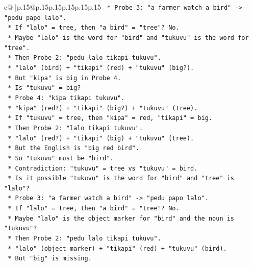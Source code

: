 \documentclass{article}
\begin{document}
{\begin{supertabular}{c@{$\;$}|p{.15\linewidth}@{}p{.15\linewidth}p{.15\linewidth}p{.15\linewidth}p{.15\linewidth}p{.15\linewidth}}
{{{\texttt{                *   Probe 3: "a farmer watch a bird" {-}> "pedu papo lalo".} \\
\texttt{                    *   If "lalo" = tree, then "a bird" = "tree"? No.} \\
\texttt{                *   Maybe "lalo" is the word for "bird" and "tukuvu" is the word for "tree".} \\
\texttt{                *   Then Probe 2: "pedu lalo tikapi tukuvu".} \\
\texttt{                    *   "lalo" (bird) + "tikapi" (red) + "tukuvu" (big?).} \\
\texttt{                    *   But "kipa" is big in Probe 4.} \\
\texttt{                    *   Is "tukuvu" = big?} \\
\texttt{                    *   Probe 4: "kipa tikapi tukuvu".} \\
\texttt{                    *   "kipa" (red?) + "tikapi" (big?) + "tukuvu" (tree).} \\
\texttt{                    *   If "tukuvu" = tree, then "kipa" = red, "tikapi" = big.} \\
\texttt{                    *   Then Probe 2: "lalo tikapi tukuvu".} \\
\texttt{                    *   "lalo" (red?) + "tikapi" (big) + "tukuvu" (tree).} \\
\texttt{                    *   But the English is "big red bird".} \\
\texttt{                    *   So "tukuvu" must be "bird".} \\
\texttt{                    *   Contradiction: "tukuvu" = tree vs "tukuvu" = bird.} \\
\texttt{                *   Is it possible "tukuvu" is the word for "bird" and "tree" is "lalo"?} \\
\texttt{                *   Probe 3: "a farmer watch a bird" {-}> "pedu papo lalo".} \\
\texttt{                    *   If "lalo" = tree, then "a bird" = "tree"? No.} \\
\texttt{                *   Maybe "lalo" is the object marker for "bird" and the noun is "tukuvu"?} \\
\texttt{                *   Then Probe 2: "pedu lalo tikapi tukuvu".} \\
\texttt{                    *   "lalo" (object marker) + "tikapi" (red) + "tukuvu" (bird).} \\
\texttt{                    *   But "big" is missing.} \\
}}}
\end{supertabular}}
\end{document}
